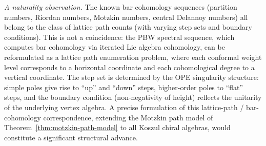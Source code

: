 \medskip

\emph{A naturality observation.} The known bar cohomology sequences (partition numbers, Riordan numbers, Motzkin numbers, central Delannoy numbers) all belong to the class of lattice path counts (with varying step sets and boundary conditions). This is not a coincidence: the PBW spectral sequence, which computes bar cohomology via iterated Lie algebra cohomology, can be reformulated as a lattice path enumeration problem, where each conformal weight level corresponds to a horizontal coordinate and each cohomological degree to a vertical coordinate. The step set is determined by the OPE singularity structure: simple poles give rise to ``up'' and ``down'' steps, higher-order poles to ``flat'' steps, and the boundary condition (non-negativity of height) reflects the unitarity of the underlying vertex algebra. A precise formulation of this lattice-path / bar-cohomology correspondence, extending the Motzkin path model of Theorem~\ref{thm:motzkin-path-model} to all Koszul chiral algebras, would constitute a significant structural advance.
